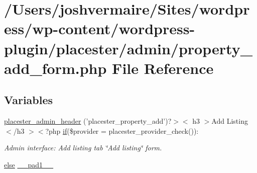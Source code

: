 \hypertarget{property__add__form_8php}{
\section{/Users/joshvermaire/Sites/wordpress/wp-\/content/wordpress-\/plugin/placester/admin/property\_\-add\_\-form.php File Reference}
\label{d6/d6d/property__add__form_8php}
}
\subsection*{Variables}
\begin{DoxyCompactItemize}
\item 
\hyperlink{property__add__form_8php_aadbfeac03579e4f226beb15313a92dec}{placester\_\-admin\_\-header} ('placester\_\-property\_\-add')?$>$$<$ h3 $>$Add Listing$<$/h3 $>$$<$?php \hyperlink{listings__list__lone__divbased_8php_a0b49fff73af3a13232913ea65ca484d9}{if}(\$provider = placester\_\-provider\_\-check()):
\begin{DoxyCompactList}\small\item\em Admin interface: Add listing tab \char`\"{}Add listing\char`\"{} form. \end{DoxyCompactList}\item 
\hyperlink{listings__list__of__map_8php_a0544c3fe466e421738dae463968b70ba}{else} \hyperlink{property__add__form_8php_ae8b4bb1441c6ab4dcb28a37bc46c8ead}{\_\-\_\-pad1\_\-\_\-}
\end{DoxyCompactItemize}


